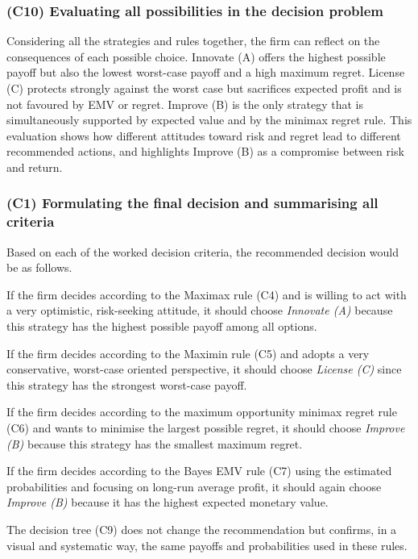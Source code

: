 	\subsubsection{(C10) Evaluating all possibilities in the decision problem}\label{example-1-c10}
	
	Considering all the strategies and rules together, the firm can reflect on the consequences of each possible choice.
	Innovate (A) offers the highest possible payoff but also the lowest worst-case payoff and a high maximum regret.
	License (C) protects strongly against the worst case but sacrifices expected profit and is not favoured by EMV or regret.
	Improve (B) is the only strategy that is simultaneously supported by expected value and by the minimax regret rule.
	This evaluation shows how different attitudes toward risk and regret lead to different recommended actions,
	and highlights Improve (B) as a compromise between risk and return.
	
	\subsubsection{(C1) Formulating the final decision and summarising all criteria}\label{example-1-c1}
	
	Based on each of the worked decision criteria, the recommended decision would be as follows.
	
	If the firm decides according to the Maximax rule (C4) and is willing to act with a very optimistic, risk-seeking attitude,
	it should choose \emph{Innovate (A)} because this strategy has the highest possible payoff among all options.
	
	If the firm decides according to the Maximin rule (C5) and adopts a very conservative, worst-case oriented perspective,
	it should choose \emph{License (C)} since this strategy has the strongest worst-case payoff.
	
	If the firm decides according to the maximum opportunity minimax regret rule (C6) and wants to minimise the largest possible regret,
	it should choose \emph{Improve (B)} because this strategy has the smallest maximum regret.
	
	If the firm decides according to the Bayes EMV rule (C7) using the estimated probabilities and focusing on long-run average profit,
	it should again choose \emph{Improve (B)} because it has the highest expected monetary value.
	
	The decision tree (C9) does not change the recommendation but confirms, in a visual and systematic way,
	the same payoffs and probabilities used in these rules.
	
